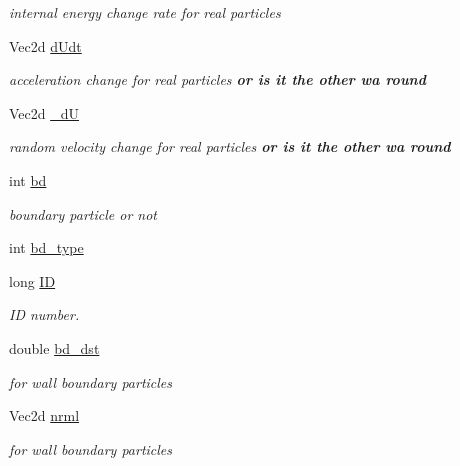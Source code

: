 \begin{CompactItemize}
\begin{CompactList}\small\item\em internal energy change rate for real particles \item\end{CompactList}\item 
\hypertarget{classParticle_b3039ea91cdab042862b80f8ecd97c3e}{
Vec2d \hyperlink{classParticle_b3039ea91cdab042862b80f8ecd97c3e}{dUdt}}
\label{classParticle_b3039ea91cdab042862b80f8ecd97c3e}

\begin{CompactList}\small\item\em acceleration change for real particles {\bf or is it the other wa round} \item\end{CompactList}\item 
\hypertarget{classParticle_da30e275fe7bb7855bf968ed7bd3adbf}{
Vec2d \hyperlink{classParticle_da30e275fe7bb7855bf968ed7bd3adbf}{\_\-dU}}
\label{classParticle_da30e275fe7bb7855bf968ed7bd3adbf}

\begin{CompactList}\small\item\em random velocity change for real particles {\bf or is it the other wa round} \item\end{CompactList}\item 
int \hyperlink{classParticle_873301ecb921ab815ef7b693033e8c88}{bd}
\begin{CompactList}\small\item\em boundary particle or not \item\end{CompactList}\item 
int \hyperlink{classParticle_73728c6443f6ade479e960ef9d070221}{bd\_\-type}
\item 
long \hyperlink{classParticle_1072ca8f2323417f321cc333d37ff1a3}{ID}
\begin{CompactList}\small\item\em ID number. \item\end{CompactList}\item 
\hypertarget{classParticle_1ef8cc0c391f174490a54ba1bb4d712f}{
double \hyperlink{classParticle_1ef8cc0c391f174490a54ba1bb4d712f}{bd\_\-dst}}
\label{classParticle_1ef8cc0c391f174490a54ba1bb4d712f}

\begin{CompactList}\small\item\em for wall boundary particles \item\end{CompactList}\item 
\hypertarget{classParticle_8397ab51179bf583b6eded2f3d2004a9}{
Vec2d \hyperlink{classParticle_8397ab51179bf583b6eded2f3d2004a9}{nrml}}
\label{classParticle_8397ab51179bf583b6eded2f3d2004a9}

\begin{CompactList}\small\item\em for wall boundary particles \item\end{CompactList}\end{CompactItemize}

